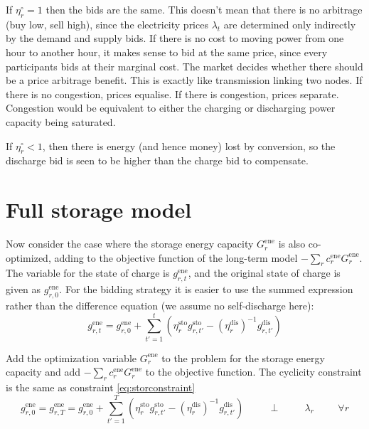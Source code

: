 \documentclass[final,3p,times]{elsarticle}
\def\l{\lambda}
\begin{document}
If $\eta_r^\circ = 1$ then the bids are the same. This doesn't mean that there is no arbitrage (buy low, sell high), since the electricity prices $\l_t$ are determined only indirectly by the demand and supply bids. If there is no cost to moving power from one hour to another hour, it makes sense to bid at the same price, since every participants bids at their marginal cost. The market decides whether there should be a price arbitrage benefit. This is exactly like transmission linking two nodes. If there is no congestion, prices equalise. If there is congestion, prices separate. Congestion would be equivalent to either the charging or discharging power capacity being saturated.

If $\eta_r^\circ < 1$, then there is energy (and hence money) lost by conversion, so the discharge bid is seen to be higher than the charge bid to compensate.

\section{Full storage model}

Now consider the case where the storage energy capacity $G^{\textrm{ene}}_r$ is also co-optimized, adding to the objective function of the long-term model  $-\sum_r c^{\textrm{ene}}_r G^{\textrm{ene}}_r$. The variable for the state of charge is
$g^{\textrm{ene}}_{r,t}$, and the original state of charge is given as $g^{\textrm{ene}}_{r,0}$. For the bidding strategy it is easier to use the summed expression rather than the difference equation (we assume no self-discharge here):
\begin{equation}
  g^{\textrm{ene}}_{r,t} = g^{\textrm{ene}}_{r,0} + \sum_{t'=1}^t \left( \eta^{\textrm{sto}}_r g^{\textrm{sto}}_{r,t'} - (\eta^{\textrm{dis}}_r)^{-1} g^{\textrm{dis}}_{r,t'} \right)
\end{equation}

Add the optimization variable $G^{\textrm{ene}}_r$ to the problem for the storage energy capacity and add $-\sum_r c^{\textrm{ene}}_r G^{\textrm{ene}}_r$ to the objective function.
The cyclicity constraint is the same as constraint \eqref{eq:storconstraint}
\begin{equation}
 g^{\textrm{ene}}_{r,0} = g^{\textrm{ene}}_{r,T} = g^{\textrm{ene}}_{r,0} + \sum_{t'=1}^T \left( \eta^{\textrm{sto}}_r g^{\textrm{sto}}_{r,t'} - (\eta^{\textrm{dis}}_r)^{-1} g^{\textrm{dis}}_{r,t'} \right)   \hspace{1cm}\perp \hspace{1cm} \lambda_{r} \hspace{1cm} \forall r
\end{equation}
\end{document}
